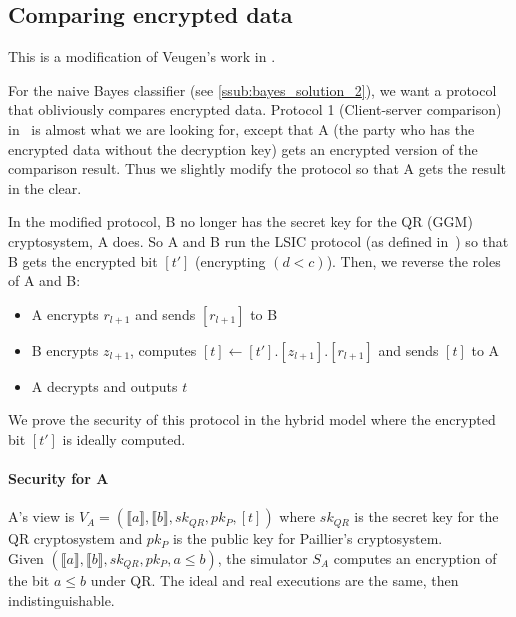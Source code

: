 \documentclass[11pt]{article}
\newcommand{\llb}{\llbracket}
\newcommand{\rrb}{\rrbracket}
\begin{document}

\subsection{Comparing encrypted data} %
\label{sub:comparing_encrypted_data}
	This is a modification of Veugen's work in \cite{Veugen}. 
	
	For the naive Bayes classifier (see \ref{ssub:bayes_solution_2}), we want a protocol that obliviously compares encrypted data. Protocol 1 (Client-server comparison) in~\cite{Veugen} is almost what we are looking for, except that A (the party who has the encrypted data without the decryption key) gets an encrypted version of the comparison result. Thus we slightly modify the protocol so that A gets the result in the clear.
	
	In the modified protocol, B no longer has the secret key for the QR (GGM) cryptosystem, A does. So A and B run the LSIC protocol (as defined in~\cite{Veugen}) so that B gets the encrypted bit $[t']$ (encrypting $(d < c)$). Then, we reverse the roles of A and B: 
	\begin{itemize}
		\item A encrypts $r_{l+1}$ and sends $[r_{l+1}]$ to B
		\item B encrypts $z_{l+1}$, computes $[t] \leftarrow [t'].[z_{l+1}].[r_{l+1}]$ and sends $[t]$ to A
		\item A decrypts and outputs $t$
	\end{itemize}
	
	We prove the security of this protocol in the hybrid model where the encrypted bit $[t']$ is ideally computed.
	
	\paragraph{Security for A} A's view is $V_A = (\llb a\rrb,\llb b\rrb,sk_{QR},pk_P,[t])$ where $sk_{QR}$ is the secret key for the QR cryptosystem and $pk_P$ is the public key for Paillier's cryptosystem.\\
	Given $(\llb a\rrb,\llb b\rrb,sk_{QR},pk_P, a \leq b)$, the simulator $S_A$ computes an encryption of the bit $a \leq b$ under QR. The ideal and real executions are the same, then indistinguishable.
	
\end{document}
